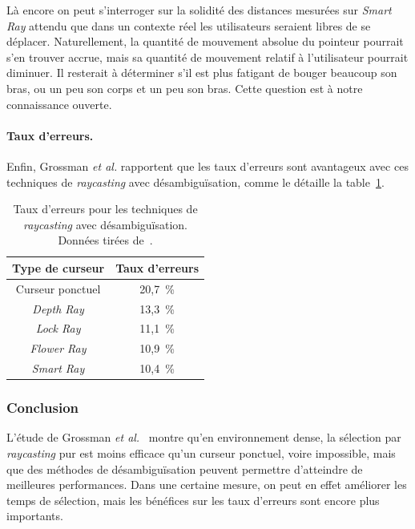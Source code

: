 	Là encore on peut s'interroger sur la solidité des distances mesurées sur \emph{Smart Ray} attendu que dans un contexte \og réel \fg{} les utilisateurs seraient libres de se déplacer. Naturellement, la quantité de mouvement absolue du pointeur pourrait s'en trouver accrue, mais sa quantité de mouvement relatif à l'utilisateur pourrait diminuer. Il resterait à déterminer s'il est plus fatigant de bouger beaucoup son bras, ou un peu son corps et un peu son bras. Cette question est à notre connaissance ouverte.
	
	\paragraph{Taux d'erreurs.}
	Enfin, Grossman \emph{et al.} rapportent que les taux d'erreurs sont avantageux avec ces techniques de \emph{raycasting} avec désambiguïsation, comme le détaille la table~\ref{tab:rayErrors}.
	
	\begin{table}[htbp]
	\centering
	\begin{tabular}{c c}
		Type de curseur			& Taux d'erreurs \bigstrut[b] \\ \hline
		Curseur ponctuel		& 20,7~\%{} \bigstrut[t] \\
		\emph{Depth Ray}		& 13,3~\%{} \\
		\emph{Lock Ray}			& 11,1~\%{} \\
		\emph{Flower Ray}		& 10,9~\%{} \\
		\emph{Smart Ray}		& 10,4~\%{} \\
	\end{tabular}
	\caption[Taux d'erreurs pour les techniques de \emph{raycasting} avec désambiguïsation]{Taux d'erreurs pour les techniques de \emph{raycasting} avec désambiguïsation. Données tirées de~\cite{grossman2006design}.}
	\label{tab:rayErrors}
	\end{table}
	
	\subsubsection{Conclusion}
	L'étude de Grossman \emph{et al.}~\cite{grossman2006design} montre qu'en environnement dense, la sélection par \emph{raycasting} pur est moins efficace qu'un curseur ponctuel, voire impossible, mais que des méthodes de désambiguïsation peuvent permettre d'atteindre de meilleures performances. Dans une certaine mesure, on peut en effet améliorer les temps de sélection, mais les bénéfices sur les taux d'erreurs sont encore plus importants.
	
